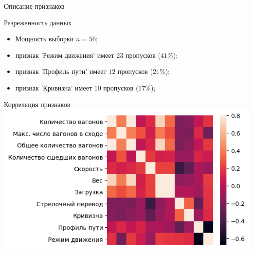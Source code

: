 \documentclass[aspectratio=169]{beamer}
\begin{document}
    \begin{frame}{Описание признаков}
        \begin{block}{Разреженность данных}
            \begin{itemize}
                \item Мощность выборки $n = 56$;
                \item признак 'Режим движения' имеет $23$ пропусков ($41\%$);
                \item признак 'Профиль пути' имеет $12$ пропусков ($21\%$);
                \item признак 'Кривизна' имеет $10$ пропусков ($17\%$);
            \end{itemize}
        \end{block}
    \end{frame}


    \begin{frame}{Корреляция признаков}
        \centering
        \includegraphics[width=1.3\textheight]{src/corr_plot.png}
    \end{frame}
\end{document}
